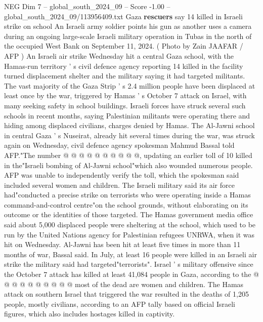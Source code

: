 \begin{textsample}{NEG Dim 7 – global\_south\_2024\_09 – Score -1.00 – global\_south\_2024\_09/113956409.txt}  \label{ex:f7_neg_225}
Gaza \textbf{rescuers} say 14 killed in Israeli strike on school An Israeli army soldier points his gun as another uses a camera during an ongoing large-scale Israeli military operation in Tubas in the north of the occupied West Bank on September 11, 2024. ( Photo by Zain JAAFAR / AFP ) An Israeli air strike Wednesday hit a central Gaza school, with the Hamas-run territory ' s civil defence agency reporting 14 killed in the facility turned displacement shelter and the military saying it had targeted militants.
The vast majority of the Gaza Strip ' s 2.4 million people have been displaced at least once by the war, triggered by Hamas ' s October 7 attack on Israel, with many seeking safety in school buildings.
Israeli forces have struck several such schools in recent months, saying Palestinian militants were operating there and hiding among displaced civilians, charges denied by Hamas.
The Al-Jawni school in central Gaza ' s Nuseirat, already hit several times during the war, was struck again on Wednesday, civil defence agency spokesman Mahmud Bassal told AFP."The number @ @ @ @ @ @ @ @ @ @, updating an earlier toll of 10 killed in the"Israeli bombing of Al-Jawni school"which also wounded numerous people.
AFP was unable to independently verify the toll, which the spokesman said included several women and children.
The Israeli military said its air force had"conducted a precise strike on terrorists who were operating inside a Hamas command-and-control centre"on the school grounds, without elaborating on its outcome or the identities of those targeted.
The Hamas government media office said about 5,000 displaced people were sheltering at the school, which used to be run by the United Nations agency for Palestinian refugees UNRWA, when it was hit on Wednesday.
Al-Jawni has been hit at least five times in more than 11 months of war, Bassal said.
In July, at least 16 people were killed in an Israeli air strike the military said had targeted"terrorists".
Israel ' s military offensive since the October 7 attack has killed at least 41,084 people in Gaza, according to the @ @ @ @ @ @ @ @ @ @ most of the dead are women and children.
The Hamas attack on southern Israel that triggered the war resulted in the deaths of 1,205 people, mostly civilians, according to an AFP tally based on official Israeli figures, which also includes hostages killed in captivity.

\end{textsample}
